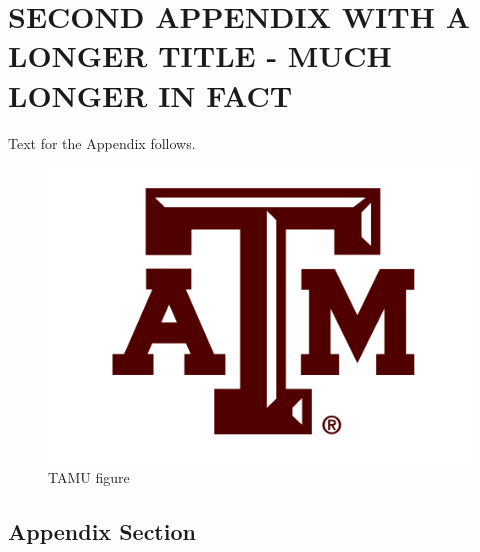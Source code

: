 %
%
%


\chapter{\uppercase {Second Appendix with a longer title - much longer in fact}}

Text for the Appendix follows.

\begin{figure}[H]
\centering
\includegraphics[scale=.50]{Figures/TAM-Logo.png}
\caption{TAMU figure}
\label{fig:tamu-fig6}
\end{figure}

\section{Appendix Section}


\pagebreak{}
